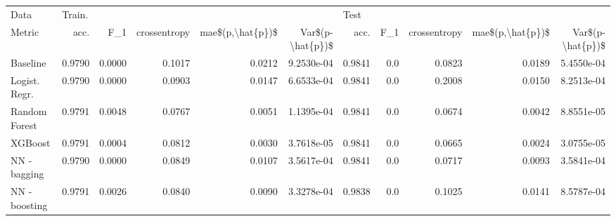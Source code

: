 \begin{tabular}{lrrrrrrrrrr}
\toprule
Data & \multicolumn{5}{l}{Train.} & \multicolumn{5}{l}{Test} \\
Metric &    acc. &     F\_1 & crossentropy & mae\$(p,\textbackslash hat\{p\})\$ & Var\$(p-\textbackslash hat\{p\})\$ &    acc. &  F\_1 & crossentropy & mae\$(p,\textbackslash hat\{p\})\$ & Var\$(p-\textbackslash hat\{p\})\$ \\
\midrule
Baseline      &  0.9790 &  0.0000 &       0.1017 &           0.0212 &       9.2530e-04 &  0.9841 &  0.0 &       0.0823 &           0.0189 &       5.4550e-04 \\
Logist. Regr. &  0.9790 &  0.0000 &       0.0903 &           0.0147 &       6.6533e-04 &  0.9841 &  0.0 &       0.2008 &           0.0150 &       8.2513e-04 \\
Random Forest &  0.9791 &  0.0048 &       0.0767 &           0.0051 &       1.1395e-04 &  0.9841 &  0.0 &       0.0674 &           0.0042 &       8.8551e-05 \\
XGBoost       &  0.9791 &  0.0004 &       0.0812 &           0.0030 &       3.7618e-05 &  0.9841 &  0.0 &       0.0665 &           0.0024 &       3.0755e-05 \\
NN - bagging  &  0.9790 &  0.0000 &       0.0849 &           0.0107 &       3.5617e-04 &  0.9841 &  0.0 &       0.0717 &           0.0093 &       3.5841e-04 \\
NN - boosting &  0.9791 &  0.0026 &       0.0840 &           0.0090 &       3.3278e-04 &  0.9838 &  0.0 &       0.1025 &           0.0141 &       8.5787e-04 \\
\bottomrule
\end{tabular}
